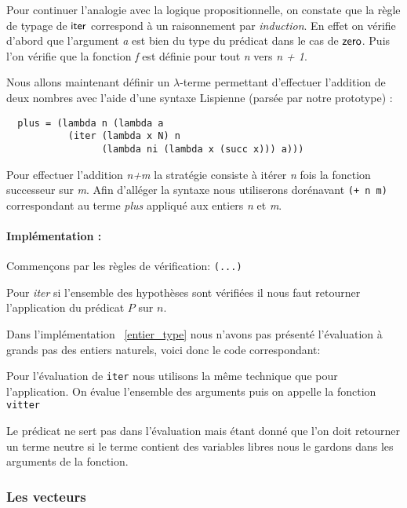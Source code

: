 \documentclass {article}
\newcommand{\codefrom}[3]
           {}
\theoremstyle{definition}
\theoremstyle{remark}
\newcommand{\fun}[1]{\lstinline!#1!}
\begin{document}
Pour continuer l'analogie avec la logique propositionnelle, on constate que la règle de typage de $\mathsf{iter}$ correspond à un raisonnement par
\emph{induction}. En effet on vérifie d'abord que l'argument \emph{a} est bien du type du prédicat dans le cas de $\mathsf{zero}$. 
Puis l'on vérifie que la fonction \emph{f} est définie pour tout \emph{n} vers \emph{n + 1}.

Nous allons maintenant définir un $\lambda$-terme permettant d'effectuer l'addition de deux nombres avec l'aide d'une syntaxe
Lispienne (parsée par notre prototype) :
\begin{lstlisting}
  plus = (lambda n (lambda a 
           (iter (lambda x N) n 
                 (lambda ni (lambda x (succ x))) a)))
\end{lstlisting}
Pour effectuer l'addition \emph{n\:+\:m} la stratégie consiste à itérer \emph{n} fois la fonction successeur sur \emph{m}.
Afin d'alléger la syntaxe nous utiliserons dorénavant \lstinline!(+ n m)! correspondant au terme \emph{plus} appliqué aux entiers \emph{n} et
\emph{m}.

\paragraph{Implémentation :} 

Commençons par les règles de vérification:
\codefrom{dependent}{lambda}{check_head}\lstinline!(...)!
\codefrom{dependent}{lambda}{check_nat}

Pour \emph{iter} si l'ensemble des hypothèses sont vérifiées il nous faut retourner l'application
du prédicat $P$ sur $n$.
\codefrom{dependent}{lambda}{synth_iter}

Dans l'implémentation ~\ref{entier_type} nous n'avons pas présenté l'évaluation à grands pas des entiers naturels, 
voici donc le code correspondant:
\codefrom{dependent}{lambda}{big_step_nat}


Pour l'évaluation de \fun{iter} nous utilisons la même technique que pour 
l'application. On évalue l'ensemble des arguments puis on appelle la fonction \fun{vitter}
\codefrom{dependent}{lambda}{big_step_iter}

Le prédicat ne sert pas dans l'évaluation mais étant donné que l'on doit retourner 
un terme neutre si le terme contient des variables libres nous le gardons dans les arguments de la
fonction.
\codefrom{dependent}{lambda}{vitter}

\subsubsection{Les vecteurs}
\end{document}
